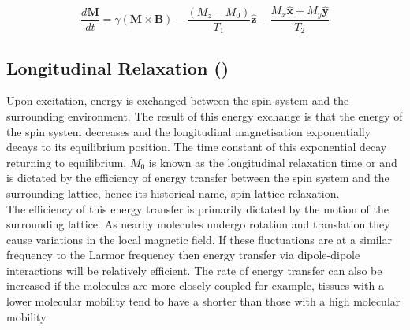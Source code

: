 \begin{equation}
\frac{d\mathbf{M}}{dt} = \gamma \left( \mathbf{M \times B} \right) - \frac{\left( M_z - M_0 \right)}{T_1}\mathbf{\hat{z}} - \frac{M_x \mathbf{\hat{x}} + M_y \mathbf{\hat{y}}}{T_2}
\label{eq:theory_bloch_full}
\end{equation}

\subsection{Longitudinal Relaxation (\tone)}
Upon excitation, energy is exchanged between the spin system and the surrounding environment. The result of this energy exchange is that the energy of the spin system decreases and the longitudinal magnetisation exponentially decays to its equilibrium position. The time constant of this exponential decay returning to equilibrium, $M_0$ is known as the longitudinal relaxation time or \tone and is dictated by the efficiency of energy transfer between the spin system and the surrounding lattice, hence its historical name, spin-lattice relaxation. \\

The efficiency of this energy transfer is primarily dictated by the motion of the surrounding lattice. As nearby molecules undergo rotation and translation they cause variations in the local magnetic field. If these fluctuations are at a similar frequency to the Larmor frequency then energy transfer via dipole-dipole interactions will be relatively efficient. The rate of energy transfer can also be increased if the molecules are more closely coupled for example, tissues with a lower molecular mobility tend to have a shorter \tone than those with a high molecular mobility.

